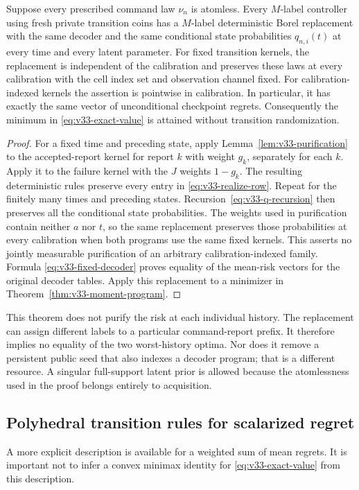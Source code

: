 \begin{theorem}
\label{thm:v33-pure}
Suppose every prescribed command law $\nu_n$ is atomless. Every
$M$-label controller using fresh private transition coins has a
$M$-label deterministic Borel replacement with the same decoder
and the same conditional state probabilities $q_{n,i}(t)$ at every
time and every latent parameter. For fixed transition kernels, the replacement is independent of the
calibration and preserves these laws at every calibration with the
cell index set and observation channel fixed. For calibration-indexed kernels the assertion
is pointwise in calibration. In particular,
it has exactly the same vector of unconditional checkpoint regrets.
Consequently the minimum in \eqref{eq:v33-exact-value} is attained
without transition randomization.
\end{theorem}
\begin{proof}
For a fixed time and preceding state, apply
Lemma~\ref{lem:v33-purification} to the accepted-report kernel for
report $k$ with weight $g_k$, separately for each $k$. Apply it to
the failure kernel with the $J$ weights $1-g_k$. The resulting
deterministic rules preserve every entry in
\eqref{eq:v33-realize-row}. Repeat for the finitely many times and
preceding states. Recursion~\eqref{eq:v33-q-recursion} then preserves
all the conditional state probabilities. The weights used in
purification contain neither $a$ nor $t$, so the same replacement
preserves those probabilities at every calibration when both programs
use the same fixed kernels. This asserts no jointly measurable
purification of an arbitrary calibration-indexed family. Formula
\eqref{eq:v33-fixed-decoder} proves equality of the mean-risk
vectors for the original decoder tables. Apply this replacement to
a minimizer in Theorem~\ref{thm:v33-moment-program}.
\end{proof}

This theorem does not purify the risk at each individual history. The
replacement can assign different labels to a particular command-report
prefix. It therefore implies no equality of the two worst-history
optima. Nor does it remove a persistent public seed that also indexes
a decoder program; that is a different resource. A singular full-support
latent prior is allowed because the atomlessness used in the proof
belongs entirely to acquisition.

\subsection{Polyhedral transition rules for scalarized regret}
A more explicit description is available for a weighted sum of mean
regrets. It is important not to infer a convex minimax identity for
\eqref{eq:v33-exact-value} from this description.

